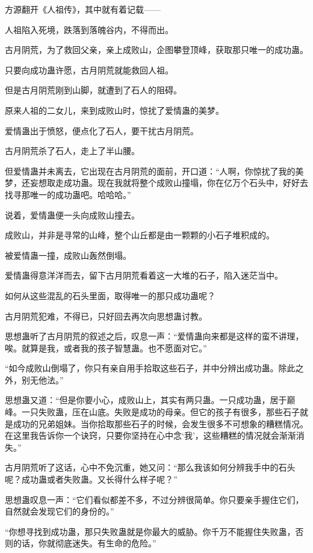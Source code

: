 
\begin{this_body}

方源翻开《人祖传》，其中就有着记载——

人祖陷入死境，跌落到落魄谷内，不得而出。

古月阴荒，为了救回父亲，亲上成败山，企图攀登顶峰，获取那只唯一的成功蛊。

只要向成功蛊许愿，古月阴荒就能救回人祖。

但是古月阴荒刚到山脚，就遭到了石人的阻碍。

原来人祖的二女儿，来到成败山时，惊扰了爱情蛊的美梦。

爱情蛊出于愤怒，便点化了石人，要干扰古月阴荒。

古月阴荒杀了石人，走上了半山腰。

但爱情蛊并未离去，它出现在古月阴荒的面前，开口道：“人啊，你惊扰了我的美梦，还妄想取走成功蛊。现在我就将整个成败山撞塌，你在亿万个石头中，好好去找寻那唯一的成功蛊吧。哈哈哈。”

说着，爱情蛊便一头向成败山撞去。

成败山，并非是寻常的山峰，整个山丘都是由一颗颗的小石子堆积成的。

被爱情蛊一撞，成败山轰然倒塌。

爱情蛊得意洋洋而去，留下古月阴荒看着这一大堆的石子，陷入迷茫当中。

如何从这些混乱的石头里面，取得唯一的那只成功蛊呢？

古月阴荒犯难，不得已，只好回去再次向思想蛊讨教。

思想蛊听了古月阴荒的叙述之后，叹息一声：“爱情蛊向来都是这样的蛮不讲理，唉。就算是我，或者我的孩子智慧蛊。也不愿面对它。”

“如今成败山倒塌了，你只有亲自用手拾取这些石子，并中分辨出成功蛊。除此之外，别无他法。”

思想蛊又道：“但是你要小心，成败山上，其实有两只蛊。一只成功蛊，居于巅峰。一只失败蛊，压在山底。失败是成功的母亲。但它的孩子有很多，那些石子就是成功的兄弟姐妹。当你拾取那些石子的时候，会发生很多不可想象的糟糕情况。在这里我告诉你一个诀窍，只要你坚持在心中念‘我’，这些糟糕的情况就会渐渐消失。”

古月阴荒听了这话，心中不免沉重，她又问：“那么我该如何分辨我手中的石头呢？成功蛊或者失败蛊。又长得什么样子呢？”

思想蛊叹息一声：“它们看似都差不多，不过分辨很简单。你只要亲手握住它们，自然就会发现它们的身份的。”

“你想寻找到成功蛊，那只失败蛊就是你最大的威胁。你千万不能握住失败蛊，否则的话，你就彻底迷失。有生命的危险。”


\end{this_body}
